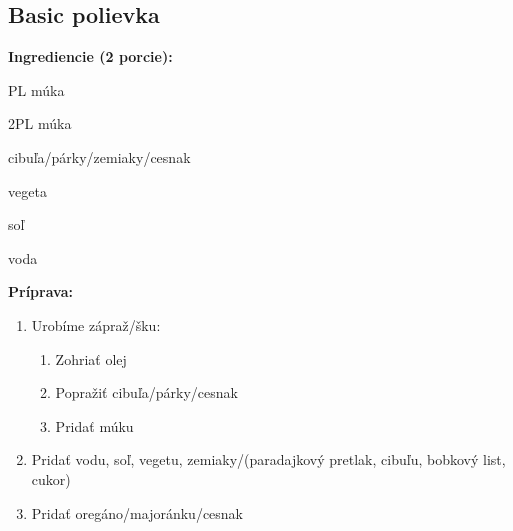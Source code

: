 \setcounter{step}{0}

\subsection{ Basic polievka }

\begin{ingredient}
  
  \def\portions{  }
  \textbf{ {\normalsize Ingrediencie (2 porcie):} }

  \begin{main}
      \item PL múka
      \item 2PL múka
      \item cibuľa/párky/zemiaky/cesnak
      \item vegeta
      \item soľ
      \item voda
  \end{main}
  
\end{ingredient}
\begin{recipe}
\textbf{ {\normalsize Príprava:} }
\begin{enumerate}

  \item{Urobíme zápraž/šku: }
      \begin{enumerate}
          \item{Zohriať olej}
          \item{Popražiť cibuľa/párky/cesnak}
          \item{Pridať múku}\end{enumerate}
  \item{Pridať vodu, soľ, vegetu, zemiaky/(paradajkový pretlak, cibuľu, bobkový list, cukor)}
  \item{Pridať oregáno/majoránku/cesnak}

\end{enumerate}
\end{recipe}

\begin{notes}
  
\end{notes}	
\clearpage
